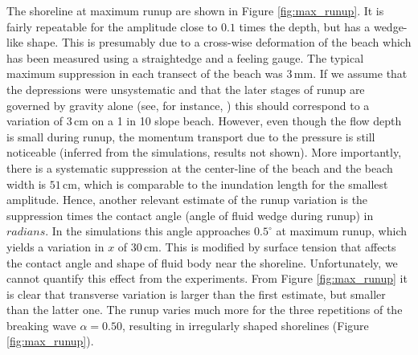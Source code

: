 \documentclass[review, authoryear]{elsarticle}
\newcommand{\cm}{\,\mbox{cm}}
\newcommand{\mm}{\,\mbox{mm}}
\begin{document}
The shoreline at maximum runup are shown in Figure \ref{fig:max_runup}. It is fairly repeatable for the amplitude close to $0.1$ times the 
depth, but has a wedge-like shape. 
 This is presumably due to a cross-wise deformation  of the beach 
which has been measured using a straightedge and a feeling gauge. 
The typical maximum suppression in each transect of the beach was $3\mm$. If we assume that the depressions were unsystematic and that the later
stages of runup are governed by gravity alone (see, for instance, \cite{jensen2003experimental}) this should correspond to a variation
 of $3\cm$ on a 1 in 10 slope beach. However, even though the
flow depth is small during runup, the momentum transport due to
 the pressure is still noticeable (inferred from the simulations, results not shown). More importantly, there is a systematic suppression at the center-line of the beach and the beach width is $51\cm$, which is comparable to the inundation length for the smallest amplitude. 
Hence, another relevant estimate of the runup variation is the suppression times the contact angle (angle of fluid wedge during runup) in $radians$. In the simulations this angle approaches $0.5^\circ$ at maximum runup, which yields a variation in $x$ of $30\cm$. This is modified by 
surface tension that affects the contact angle and 
shape of fluid body near the shoreline. Unfortunately, we cannot
quantify this effect from the experiments.  
From Figure 
\ref{fig:max_runup} it is clear that transverse variation is larger than the first estimate, but smaller than the latter one. The runup varies much more for the three repetitions of the breaking wave $\alpha=0.50$,
resulting in irregularly shaped shorelines  (Figure \ref{fig:max_runup}).
\end{document}
